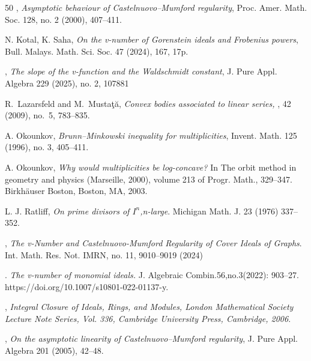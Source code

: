 \documentclass[11pt,reqno,a4paper]{amsart}
\theoremstyle{definition}
\begin{document}
\begin{thebibliography}{50}
 , \textit {Asymptotic behaviour of Castelnuovo–Mumford regularity}, Proc. Amer. Math. Soc. 128,
no. 2 (2000), 407–411.




 {N. Kotal, K. Saha}, {\textit {On the v-number of Gorenstein ideals and Frobenius powers}}, Bull. Malays.
Math. Sci. Soc. 47 (2024), 167, 17p.




, {\textit{The slope of the v-function and the Waldschmidt constant}}, J. Pure
Appl. Algebra 229 (2025), no. 2, 107881



R.~Lazarsfeld and M.~Musta{\c{t}}\u{a},
\newblock \textit { Convex bodies associated to linear series,}
,
{ 42} (2009), no.~5, 783--835.


 

 

 {A. Okounkov}, \textit  {Brunn–Minkowski inequality for multiplicities}, Invent. Math. 125 (1996), no. 3, 405–411.

 
 
 {A. Okounkov},\textit{ Why would multiplicities be log-concave? }In The orbit method in geometry and physics
(Marseille, 2000), volume 213 of Progr. Math., 329–347. Birkh\"auser Boston, Boston, MA, 2003.



 {L. J. Ratliff}, \textit{On prime divisors of \(I^n\),n-large}.  Michigan Math. J. 23 (1976)
337–352.



, \textit{ The v-Number and Castelnuovo-Mumford Regularity of Cover Ideals of Graphs}. Int.
Math. Res. Not. IMRN, no. 11, 9010–9019 (2024)




. {\textit {The v-number of monomial ideals.}} J. Algebraic Combin.56,no.3(2022): 903–27.
https://doi.org/10.1007/s10801-022-01137-y.




,{\textit{ Integral Closure of Ideals, Rings, and Modules, London Mathematical Society Lecture Note Series, Vol. 336, Cambridge University Press, Cambridge,
2006}}.







, \textit{ On the asymptotic linearity of Castelnuovo–Mumford regularity}, J. Pure
Appl. Algebra 201 (2005), 42–48.







\end{thebibliography}
\end{document}

